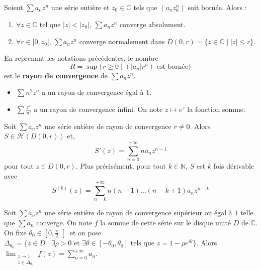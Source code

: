   \begin{lemma}[Abel]
    Soient $\sum a_n z^n$ une série entière et $z_0 \in \mathbb{C}$ tels que $(a_n z_0^n)$ soit bornée. Alors :
    \begin{enumerate}[label=(\roman*)]
      \item $\forall z \in \mathbb{C}$ tel que $|z| < |z_0|$, $\sum a_n z^n$ converge absolument.
      \item $\forall r \in ]0,z_0[, \, \sum a_n z^n$ converge normalement dans $\overline{D}(0, r) = \{ z \in \mathbb{C} \mid |z| \leq r \}$.
    \end{enumerate}
  \end{lemma}

  \begin{definition}
    En reprenant les notations précédentes, le nombre
    \[ R = \sup \{ r \geq 0 \mid (|a_n|r^n) \text{ est bornée} \} \]
    est le \textbf{rayon de convergence} de $\sum a_n z^n$.
  \end{definition}


  \begin{example}
    \begin{itemize}
      \item $\sum n^2 z^n$ a un rayon de convergence égal à $1$.
      \item $\sum \frac{z^n}{n!}$ a un rayon de convergence infini. On note $z \mapsto e^z$ la fonction somme.
    \end{itemize}
  \end{example}


  \begin{proposition}
    Soit $\sum a_n z^n$ une série entière de rayon de convergence $r \neq 0$. Alors $S \in \mathcal{H}(D(0, r))$ et,
    \[ S'(z) = \sum_{n=0}^{+\infty} n a_n z^{n-1} \]
    pour tout $z \in D(0, r)$.
    \newpar
    Plus précisément, pour tout $k \in \mathbb{N}$, $S$ est $k$ fois dérivable avec
    \[ S^{(k)}(z) = \sum_{n=k}^{+\infty} n (n-1) \dots (n-k+1) a_n z^{n-k} \]
  \end{proposition}


  \begin{theorem}
    \label{241-2}
    Soit $\sum a_n z^n$ une série entière de rayon de convergence supérieur ou égal à $1$ telle que $\sum a_n$ converge. On note $f$ la somme de cette série sur le disque unité $D$ de $\mathbb{C}$. On fixe $\theta_0 \in \left[ 0, \frac{\pi}{2} \right[$ et on pose $\Delta_{\theta_0} = \{ z \in D \mid \exists \rho > 0 \text{ et } \exists \theta \in [-\theta_0, \theta_0] \text{ tels que } z = 1 - \rho e^{i\theta} \}$.
    \newpar
    Alors $\lim_{\substack{z \rightarrow 1 \\ z \in \Delta_{\theta_0}}} f(z) = \sum_{n=0}^{+\infty} a_n$.
  \end{theorem}

